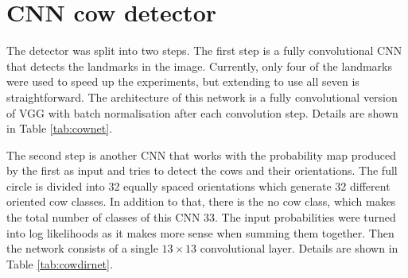 \documentclass{cta-author}
\begin{document}
\section{CNN cow detector}

The detector was split into two steps. The first step is a fully convolutional CNN that detects the landmarks in the image. Currently, only four of the landmarks were used to speed up the experiments, but extending to use all seven is straightforward. The architecture of this network is a fully convolutional version of VGG \cite{Simonyan14c} with batch normalisation \cite{DBLP:journals/corr/IoffeS15} after each convolution step. Details are shown in Table \ref{tab:cownet}.

The second step is another CNN that works with the probability map produced by the first as input and tries to detect the cows and their orientations. The full circle is divided into 32 equally spaced orientations which generate 32 different oriented cow classes. In addition to that, there is the no cow class, which makes the total number of classes of this CNN 33. The input probabilities were turned into log likelihoods as it makes more sense when summing them together. Then the network consists of a single $ 13 \times 13 $ convolutional layer. Details are shown in Table \ref{tab:cowdirnet}.
\end{document}

